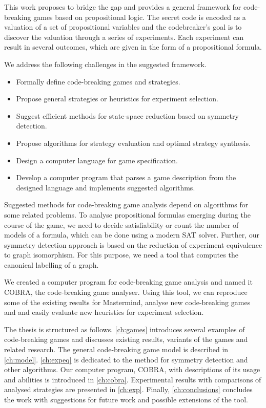 This work proposes to bridge the gap and provides
  a general framework for code-breaking games
  based on propositional logic.
The secret code is encoded as a valuation of
  a set of propositional variables
  and the codebreaker's goal is to discover the valuation
  through a series of experiments.
Each experiment can result in several outcomes,
  which are given in the form of a propositional formula.

We address the following challenges in the suggested framework.
\begin{itemize}
\item Formally define code-breaking games and strategies.
\item Propose general strategies or heuristics for experiment selection.
\item Suggest efficient methods for state-space reduction based on symmetry detection.
\item Propose algorithms for strategy evaluation and optimal strategy synthesis.
\item Design a computer language for game specification.
\item Develop a computer program that parses a game description from the
  designed language and implements suggested algorithms.
\end{itemize}

Suggested methods for code-breaking game analysis depend
  on algorithms for some related problems.
To analyse propositional formulas emerging during the course of the game,
  we need to decide satisfiability or count the number of models of
  a formula, which can be done using a modern SAT solver.
Further, our symmetry detection approach is based on the reduction
  of experiment equivalence to graph isomorphism.
For this purpose, we need a tool that computes the canonical labelling of a graph.

We created a computer program for code-breaking game analysis and named it COBRA,
  the code-breaking game analyser.
Using this tool, we can reproduce some of the existing results
  for Mastermind, analyse new code-breaking games and and easily evaluate new heuristics
  for experiment selection.

The thesis is structured as follows.
\autoref{ch:games} introduces several examples of code-breaking games and
  discusses existing results, variants of the games and related research.
The general code-breaking game model is described in \autoref{ch:model}.
\autoref{ch:expeq} is dedicated to the method for symmetry detection and other algorithms.
Our computer program, COBRA, with descriptions of its usage and
  abilities is introduced in \autoref{ch:cobra}.
Experimental results with comparisons of analysed strategies
  are presented in \autoref{ch:exp}.
Finally, \autoref{ch:conclusions} concludes the work with suggestions for future work
  and possible extensions of the tool.






